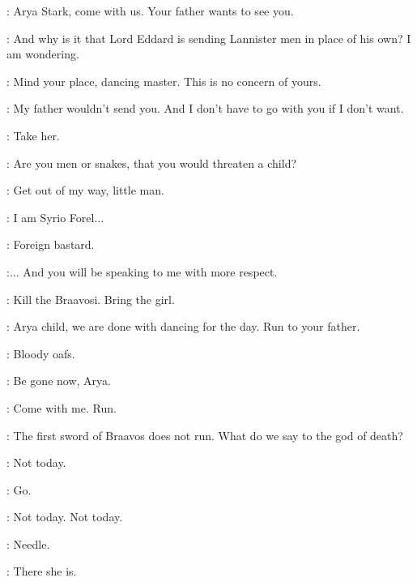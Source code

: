 \MERYN: Arya Stark, come with us. Your father wants to see you. 

\SYRIO: And why is it that Lord Eddard is sending Lannister men in place of his own? I am wondering. 

\MERYN: Mind your place, dancing master. This is no concern of yours. 

\ARYA: My father wouldn't send you. And I don't have to go with you if I don't want. 

\MERYN: Take her. 

\SYRIO: Are you men or snakes, that you would threaten a child? 

\MERYN: Get out of my way, little man. 

\SYRIO: I am Syrio Forel$\ldots$ 

\MERYN: Foreign bastard. 

\SYRIO:$\ldots$ And you will be speaking to me with more respect. 

\MERYN: Kill the Braavosi. Bring the girl. 

\SYRIO: Arya child, we are done with dancing for the day. Run to your father. 


\MERYN: Bloody oafs. 

\SYRIO: Be gone now, Arya. 

\ARYA: Come with me. Run. 

\SYRIO: The first sword of Braavos does not run.  What do we say to the god of death? 

\ARYA: Not today. 

\SYRIO: Go. 


\scene


\ARYA:  Not today. Not today. 


\ARYA: Needle. 


\BOY: There she is. 

